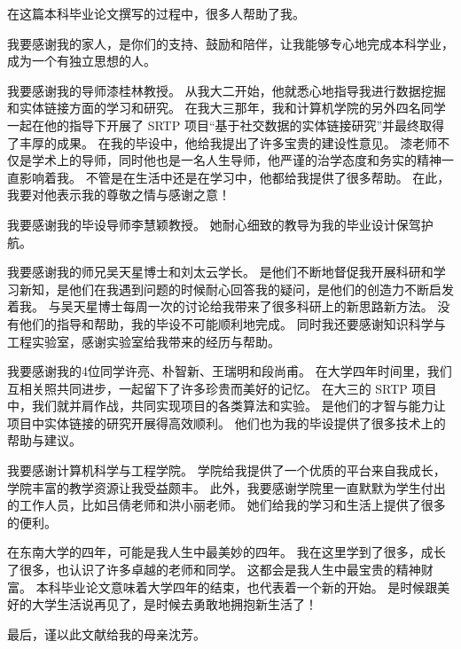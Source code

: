 \documentclass[bachelor]{seuthesis} %
\begin{document}
\tableofcontents

% 

\begin{Main}








\end{Main}

\begin{Acknowledgement}
在这篇本科毕业论文撰写的过程中，很多人帮助了我。\par

我要感谢我的家人，是你们的支持、鼓励和陪伴，让我能够专心地完成本科学业，成为一个有独立思想的人。

我要感谢我的导师漆桂林教授。
从我大二开始，他就悉心地指导我进行数据挖掘和实体链接方面的学习和研究。
在我大三那年，我和计算机学院的另外四名同学一起在他的指导下开展了 SRTP 项目``基于社交数据的实体链接研究''并最终取得了丰厚的成果。
在我的毕设中，他给我提出了许多宝贵的建设性意见。
漆老师不仅是学术上的导师，同时他也是一名人生导师，他严谨的治学态度和务实的精神一直影响着我。
不管是在生活中还是在学习中，他都给我提供了很多帮助。
在此，我要对他表示我的尊敬之情与感谢之意！\par

我要感谢我的毕设导师李慧颖教授。
她耐心细致的教导为我的毕业设计保驾护航。\par

我要感谢我的师兄吴天星博士和刘太云学长。
是他们不断地督促我开展科研和学习新知，是他们在我遇到问题的时候耐心回答我的疑问，是他们的创造力不断启发着我。
与吴天星博士每周一次的讨论给我带来了很多科研上的新思路新方法。
没有他们的指导和帮助，我的毕设不可能顺利地完成。
同时我还要感谢知识科学与工程实验室，感谢实验室给我带来的经历与帮助。\par

我要感谢我的4位同学许亮、朴智新、王瑞明和段尚甫。
在大学四年时间里，我们互相关照共同进步，一起留下了许多珍贵而美好的记忆。
在大三的 SRTP 项目中，我们就并肩作战，共同实现项目的各类算法和实验。
是他们的才智与能力让项目中实体链接的研究开展得高效顺利。
他们也为我的毕设提供了很多技术上的帮助与建议。\par

我要感谢计算机科学与工程学院。
学院给我提供了一个优质的平台来自我成长，学院丰富的教学资源让我受益颇丰。
此外，我要感谢学院里一直默默为学生付出的工作人员，比如吕倩老师和洪小丽老师。
她们给我的学习和生活上提供了很多的便利。\par

在东南大学的四年，可能是我人生中最美妙的四年。
我在这里学到了很多，成长了很多，也认识了许多卓越的老师和同学。
这都会是我人生中最宝贵的精神财富。
本科毕业论文意味着大学四年的结束，也代表着一个新的开始。
是时候跟美好的大学生活说再见了，是时候去勇敢地拥抱新生活了！\par

最后，谨以此文献给我的母亲沈芳。
\end{Acknowledgement}
\end{document}
